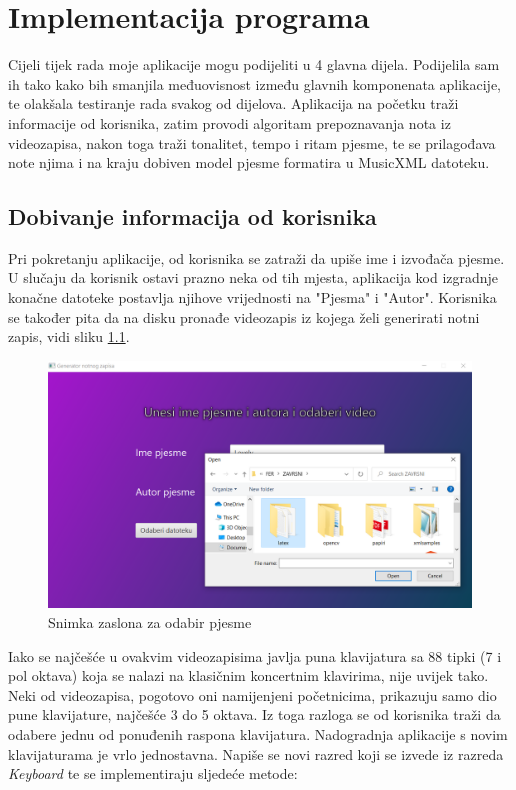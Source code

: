 \documentclass[times, utf8, zavrsni, numeric]{fer}
\begin{document}
\chapter{Implementacija programa}
Cijeli tijek rada moje aplikacije mogu podijeliti u 4 glavna dijela. Podijelila sam ih tako kako bih smanjila međuovisnost između glavnih komponenata aplikacije, te olakšala testiranje rada svakog od dijelova. Aplikacija na početku traži informacije od korisnika, zatim provodi algoritam prepoznavanja nota iz videozapisa, nakon toga traži tonalitet, tempo i ritam pjesme, te se prilagođava note njima i na kraju dobiven model pjesme formatira u MusicXML datoteku.

\section{Dobivanje informacija od korisnika}
Pri pokretanju aplikacije, od korisnika se zatraži da upiše ime i izvođača pjesme. U slučaju da korisnik ostavi prazno neka od tih mjesta, aplikacija kod izgradnje konačne datoteke postavlja njihove vrijednosti na "Pjesma" i "Autor". Korisnika se također pita da na disku pronađe videozapis iz kojega želi generirati notni zapis, vidi sliku \ref{fig:screen1}.

\begin{figure}[h]
	\includegraphics[scale=0.43]{screen1.png}
	\centering
	\caption{Snimka zaslona za odabir pjesme}
	\label{fig:screen1}
\end{figure}

Iako se najčešće u ovakvim videozapisima javlja puna klavijatura sa 88 tipki (7 i pol oktava) koja se nalazi na klasičnim koncertnim klavirima, nije uvijek tako. Neki od videozapisa, pogotovo oni namijenjeni početnicima, prikazuju samo dio pune klavijature, najčešće 3 do 5 oktava. Iz toga razloga se od korisnika traži da odabere jednu od ponuđenih raspona klavijatura. Nadogradnja aplikacije s novim klavijaturama je vrlo jednostavna. Napiše se novi razred koji se izvede iz razreda \textit{Keyboard} te se implementiraju sljedeće metode:
\end{document}
